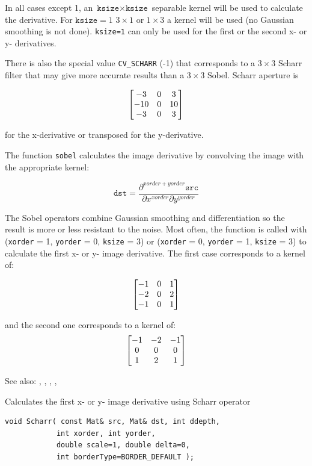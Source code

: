 In all cases except 1, an $\texttt{ksize} \times
\texttt{ksize}$ separable kernel will be used to calculate the
derivative. For $\texttt{ksize} = 1$ $ 3 \times 1$ or $ 1 \times 3$
a kernel will be used (no Gaussian smoothing is not done). \texttt{ksize=1} can only be used for the first or the second x- or y- derivatives.

There is also the special value \texttt{CV\_SCHARR} (-1) that corresponds to a $3\times3$ Scharr
filter that may give more accurate results than a $3\times3$ Sobel. Scharr
aperture is

\[ \begin{bmatrix} -3 & 0 & 3\\ -10 & 0 & 10\\ -3 & 0 & 3 \end{bmatrix}
\]

for the x-derivative or transposed for the y-derivative.

The function \texttt{sobel} calculates the image derivative by convolving the image with the appropriate kernel:

\[
\texttt{dst} = \frac{\partial^{xorder+yorder} \texttt{src}}{\partial x^{xorder} \partial y^{yorder}}
\]

The Sobel operators combine Gaussian smoothing and differentiation
so the result is more or less resistant to the noise. Most often,
the function is called with (\texttt{xorder} = 1, \texttt{yorder} = 0,
\texttt{ksize} = 3) or (\texttt{xorder} = 0, \texttt{yorder} = 1,
\texttt{ksize} = 3) to calculate the first x- or y- image
derivative. The first case corresponds to a kernel of:

\[ \begin{bmatrix} -1 & 0 & 1\\ -2 & 0 & 2\\ -1 & 0 & 1 \end{bmatrix}
\]

and the second one corresponds to a kernel of:
\[ \begin{bmatrix} -1 & -2 & -1\\ 0 & 0 & 0\\ 1 & 2 & 1 \end{bmatrix}
\]

See also: , , , , 

\label{Scharr}
Calculates the first x- or y- image derivative using Scharr operator

\begin{lstlisting}
void Scharr( const Mat& src, Mat& dst, int ddepth,
            int xorder, int yorder,
            double scale=1, double delta=0,
            int borderType=BORDER_DEFAULT );
\end{lstlisting}
\begin{description}
\end{description}

